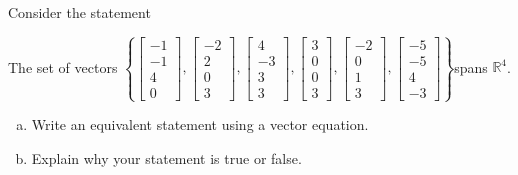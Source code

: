 
\begin{exerciseStatement}


Consider the statement 
\begin{center}\begin{minipage}{0.8\textwidth}
 The set of vectors \( \left\{ \left[\begin{array}{c}
-1 \\
-1 \\
4 \\
0
\end{array}\right] , \left[\begin{array}{c}
-2 \\
2 \\
0 \\
3
\end{array}\right] , \left[\begin{array}{c}
4 \\
-3 \\
3 \\
3
\end{array}\right] , \left[\begin{array}{c}
3 \\
0 \\
0 \\
3
\end{array}\right] , \left[\begin{array}{c}
-2 \\
0 \\
1 \\
3
\end{array}\right] , \left[\begin{array}{c}
-5 \\
-5 \\
4 \\
-3
\end{array}\right] \right\} \)spans \(\mathbb{R}^4\). 
\end{minipage}\end{center}
    


\begin{enumerate}[(a)]
\item  Write an equivalent statement using a vector equation.
\item  Explain why your statement is true or false.
\end{enumerate}
    
\end{exerciseStatement}
    
